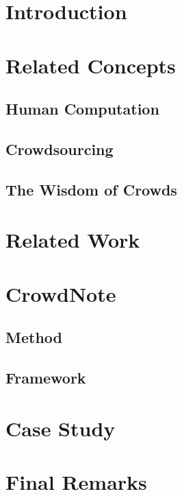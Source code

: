 \documentclass[sigconf]{acmart}
\begin{document}
\maketitle

\pagebreak
\section{Introduction}
	

\section{Related Concepts}
	

	\subsection{Human Computation}
	

%	

	\subsection{Crowdsourcing}
	

	\subsection{The Wisdom of Crowds}
	
	
\section{Related Work}
	

\section{CrowdNote}

\subsection{Method} 
	

\subsection{Framework}
	

\section{Case Study}
	

\section{Final Remarks}
	

\begin{acks}
	
\end{acks}



 
\end{document}
